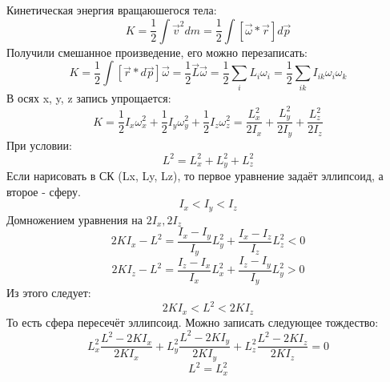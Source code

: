     Кинетическая энергия вращаюшегося тела:
    \[K = \frac{1}{2}\int \Vec{v}^2dm = \frac{1}{2}\int [\Vec{\omega} * \Vec{r}] d\Vec{p}\]
    Получили смешанное произведение, его можно перезаписать:
    \[K = \frac{1}{2}\int [\Vec{r} * d\Vec{p}]\Vec{\omega} = \frac{1}{2}\Vec{L}\Vec{\omega} = \frac{1}{2}\sum_i L_i\omega_i = \frac{1}{2}\sum_{ik}I_{ik}\omega_i \omega_k\]
    В осях x, y, z запись упрощается:
    \[K = \frac{1}{2}I_x\omega_x^2 + \frac{1}{2}I_y\omega_y^2 + \frac{1}{2}I_z\omega_z^2 = \frac{L_x^2}{2I_x} + \frac{L_y^2}{2I_y} + \frac{L_z^2}{2I_z}\]
    При условии:
    \[L^2 = L_x^2 + L_y^2 + L_z^2\]
    Если нарисовать в СК (Lx, Ly, Lz), то первое уравнение задаёт эллипсоид, а второе - сферу.
    \[I_x < I_y < I_z\]
    Домножением уравнения на $2I_x, 2I_z$
    \[2KI_x - L^2 = \frac{I_x - I_y}{I_y}L_y^2 + \frac{I_x - I_z}{I_z}L_z^2 < 0\]
    \[2KI_z - L^2 = \frac{I_z - I_x}{I_x}L_x^2 + \frac{I_z - I_y}{I_y}L_y^2 > 0\]
    Из этого следует:
    \[2KI_x < L^2 < 2KI_z\]
    То есть сфера пересечёт эллипсоид.
    Можно записать следующее тождество:
    \[L_x^2\frac{L^2 - 2KI_x}{2KI_x} + L_y^2\frac{L^2 - 2KI_y}{2KI_y} + L_z^2\frac{L^2 - 2KI_z}{2KI_z} = 0\]
    \[L^2 = L_x^2\]